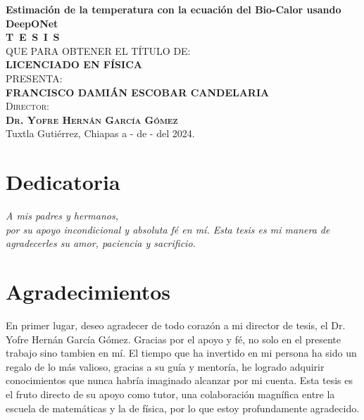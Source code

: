 \begin{titlepage}
\begin{minipage}[t][0.95\textheight][c]{0.76\textwidth}
            \begin{center}
                {\Large\bfseries Estimación de la temperatura con la ecuación del Bio-Calor usando DeepONet}\\[2cm]
                \textsc{\huge \textbf{T\, E\, S\, I\, S}}\\[1.5cm]
                \textsc{\large QUE PARA OBTENER EL TÍTULO DE:}\\[0.3cm]
                \textbf{\textsc{LICENCIADO EN FÍSICA}}\\[1.5cm]
                \textsc{\large PRESENTA:}\\[0.3cm]
                \textbf{\textsc{\large {FRANCISCO DAMIÁN ESCOBAR CANDELARIA}}}\\[2cm]
                {\large\scshape Director:\\[0.3cm]
                {\textbf{\large Dr. Yofre Hernán García Gómez }}}\\[2.0cm]
                \large{Tuxtla Gutiérrez, Chiapas a - de - del 2024.}

            \end{center}
\end{minipage}
\end{titlepage}

\pagebreak[2]

\chapter*{Dedicatoria}
\begin{flushright}
\textit{A mis padres y hermanos, \\ por su apoyo incondicional y absoluta fé en mí. Esta tesis es mi manera de agradecerles su amor, paciencia y sacrificio.}
\end{flushright}


\chapter*{Agradecimientos}
En primer lugar, deseo agradecer de todo corazón a mi director de tesis, el Dr. Yofre Hernán García Gómez. Gracias por el apoyo y fé, no solo en el presente trabajo sino tambien en mí. El tiempo que ha invertido en mi persona ha sido un regalo de lo más valioso, gracias a su guía y mentoría, he logrado adquirir conocimientos que nunca habría imaginado alcanzar por mi cuenta. Esta tesis es el fruto directo de su apoyo como tutor, una colaboración magnífica entre la escuela de matemáticas y la de física, por lo que estoy profundamente agradecido.

